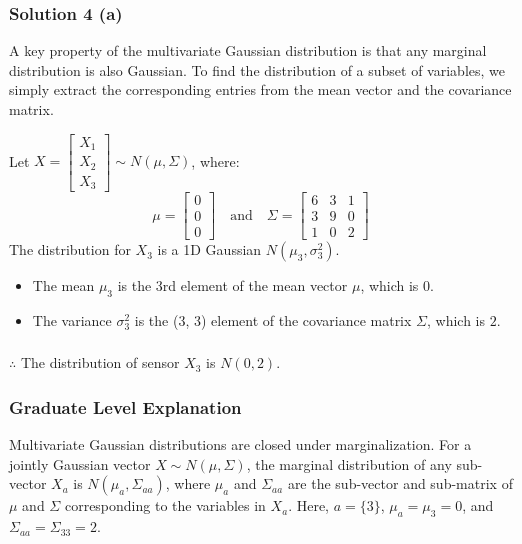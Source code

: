 \documentclass{article}
\begin{document}
\subsubsection*{Solution 4 (a)}
A key property of the multivariate Gaussian distribution is that any marginal distribution is also Gaussian. To find the distribution of a subset of variables, we simply extract the corresponding entries from the mean vector and the covariance matrix.

Let $X = \begin{bmatrix} X_1 \\ X_2 \\ X_3 \end{bmatrix} \sim N(\mu, \Sigma)$, where:
$$ \mu = \begin{bmatrix} 0 \\ 0 \\ 0 \end{bmatrix} \quad \text{and} \quad \Sigma = \begin{bmatrix} 6 & 3 & 1 \\ 3 & 9 & 0 \\ 1 & 0 & 2 \end{bmatrix} $$
The distribution for $X_3$ is a 1D Gaussian $N(\mu_3, \sigma_3^2)$.
\begin{itemize}
    \item The mean $\mu_3$ is the 3rd element of the mean vector $\mu$, which is $0$.
    \item The variance $\sigma_3^2$ is the (3, 3) element of the covariance matrix $\Sigma$, which is $2$.
\end{itemize}

\subsubsection*{\normalfont}{$\therefore$ The distribution of sensor $X_3$ is $N(0, 2)$.}

\subsubsection*{Graduate Level Explanation}
Multivariate Gaussian distributions are closed under marginalization. For a jointly Gaussian vector $X \sim N(\mu, \Sigma)$, the marginal distribution of any sub-vector $X_a$ is $N(\mu_a, \Sigma_{aa})$, where $\mu_a$ and $\Sigma_{aa}$ are the sub-vector and sub-matrix of $\mu$ and $\Sigma$ corresponding to the variables in $X_a$. Here, $a=\{3\}$, $\mu_a = \mu_3 = 0$, and $\Sigma_{aa} = \Sigma_{33} = 2$.
\end{document}
